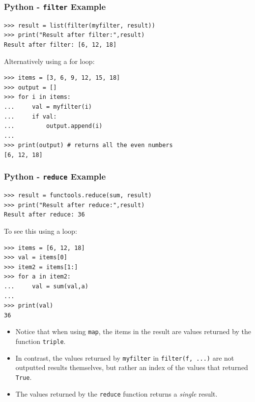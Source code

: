 \documentclass[xcolor=svgnames, handout]{beamer}
\newcommand{\nl}{\\[1em]}
\newcommand{\ft}[1]{\frametitle{#1}}
\begin{document}
\begin{frame}[fragile]\ft{Python - {\tt filter} Example}
\begin{Verbatim}[xleftmargin=.1in, frame=single] 
>>> result = list(filter(myfilter, result))
>>> print("Result after filter:",result)
Result after filter: [6, 12, 18]
\end{Verbatim}
Alternatively using a for loop:
\begin{Verbatim}[xleftmargin=.1in, frame=single] 
>>> items = [3, 6, 9, 12, 15, 18]
>>> output = []
>>> for i in items:
...     val = myfilter(i)
...     if val:
...         output.append(i)
... 
>>> print(output) # returns all the even numbers
[6, 12, 18]
\end{Verbatim}
\end{frame}


\begin{frame}[fragile]\ft{Python - {\tt reduce} Example}
\begin{Verbatim}[xleftmargin=.1in, frame=single] 
>>> result = functools.reduce(sum, result)
>>> print("Result after reduce:",result)
Result after reduce: 36
\end{Verbatim}
To see this using a loop:
\begin{Verbatim}[frame=single]
>>> items = [6, 12, 18]
>>> val = items[0]
>>> item2 = items[1:]
>>> for a in item2:
...     val = sum(val,a)
... 
>>> print(val)
36
\end{Verbatim}
\end{frame}



\begin{frame}
\begin{itemize}
\item Notice that when using {\tt map}, the items in the result are values returned by the function {\tt triple}.\nl

\item In contrast, the values returned by {\tt myfilter} in {\tt filter(f, ...)} are not outputted results themselves, but rather an index of the values that returned {\tt True}.\nl

\item The values returned by the {\tt reduce} function returns a \textit{single} result.


\end{itemize}
\end{frame}
\end{document}
